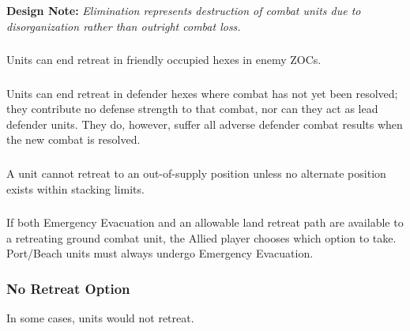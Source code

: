 \textbf{Design Note:} \textit{Elimination represents destruction of combat units due to disorganization rather than outright combat loss.}

\subsubsection{}
Units can end retreat in friendly occupied hexes in enemy ZOCs.

\subsubsection{}
Units can end retreat in defender hexes where combat has not yet been resolved; they contribute no defense strength to that combat, nor can they act as lead defender units. They do, however, suffer all adverse defender combat results when the new combat is resolved.

\subsubsection{}
A unit cannot retreat to an out-of-supply position unless no alternate position exists within stacking limits.

\subsubsection{}
If both Emergency Evacuation and an allowable land retreat path are available to a retreating ground combat unit, the Allied player chooses which option to take. Port/Beach units must always undergo Emergency Evacuation.

\subsubsection{\textbf{No Retreat Option}}

In some cases, units would not retreat.

